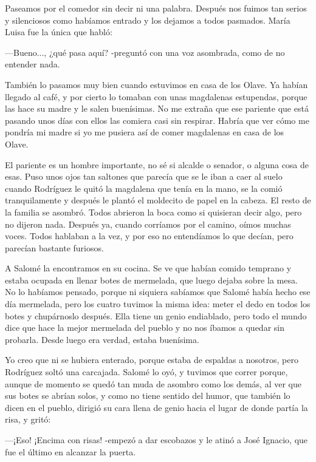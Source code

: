 \documentclass{barcodevapor3pags}
\begin{document}
Paseamos por el comedor sin decir ni una palabra. Después nos fuimos tan
serios y silenciosos como habíamos entrado y los dejamos a todos
pasmados. María Luisa fue la única que habló:~

---Bueno..., ¿qué pasa aquí? -preguntó con una voz asombrada, como de no
entender nada.



También lo pasamos muy bien cuando estuvimos en casa de los Olave. Ya
habían llegado al café, y por cierto lo tomaban con unas magdalenas
estupendas, porque las hace su madre y le salen buenísimas. No me
extraña que ese pariente que está pasando unos días con ellos las
comiera casi sin respirar. Habría que ver cómo me pondría mi madre si yo
me pusiera así de comer magdalenas en casa de los Olave.~

El pariente es un hombre importante, no sé si alcalde o senador, o
alguna cosa de esas. Puso unos ojos tan saltones que parecía que se le
iban a caer al suelo cuando Rodríguez le quitó la magdalena que tenía en
la mano, se la comió tranquilamente y después le plantó el moldecito de
papel en la cabeza. El resto de la familia se asombró. Todos abrieron la
boca como si quisieran decir algo, pero no dijeron nada. Después ya,
cuando corríamos por el camino, oímos muchas voces. Todos hablaban a la
vez, y por eso no entendíamos lo que decían, pero parecían bastante
furiosos.~

A Salomé la encontramos en su cocina. Se ve que habían comido temprano y
estaba ocupada en llenar botes de mermelada, que luego dejaba sobre la
mesa.~
No lo habíamos pensado, porque ni siquiera sabíamos que Salomé había
hecho ese día mermelada, pero los cuatro tuvimos la misma idea: meter el
dedo en todos los botes y chupárnoslo después. Ella tiene un genio
endiablado, pero todo el mundo dice que hace la mejor mermelada del
pueblo y no nos íbamos a quedar sin probarla. Desde luego era verdad,
estaba buenísima.~

Yo creo que ni se hubiera enterado, porque estaba de espaldas a
nosotros, pero Rodríguez soltó una carcajada. Salomé lo oyó, y tuvimos
que correr porque, aunque de momento se quedó tan muda de asombro como
los demás, al ver que sus botes se abrían solos, y como no tiene sentido
del humor, que también lo dicen en el pueblo, dirigió su cara llena de
genio hacia el lugar de donde partía la risa, y gritó:~

---¡Eso! ¡Encima con risas! -empezó a dar escobazos y le atinó a José
Ignacio, que fue el último en alcanzar la puerta.~
\end{document}
